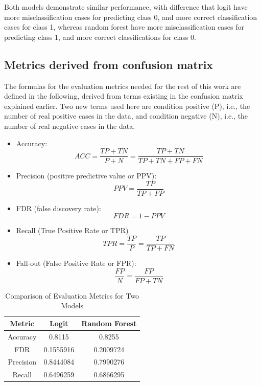 \documentclass{article}
\providecommand{\tightlist}{%
  \setlength{\itemsep}{0pt}\setlength{\parskip}{0pt}}
\begin{document}
Both models demonstrate similar performance, with difference that logit
have more misclassification cases for predicting class 0, and more
correct classification cases for class 1, whereas random forest have
more misclassification cases for predicting class 1, and more correct
classifications for class 0.

\hypertarget{metrics-derived-from-confusion-matrix}{%
\subsection{Metrics derived from confusion
matrix}\label{metrics-derived-from-confusion-matrix}}

The formulas for the evaluation metrics needed for the rest of this work
are defined in the following, derived from terms existing in the
confusion matrix explained earlier. Two new terms used here are
condition positive (P), i.e., the number of real positive cases in the
data, and condition negative (N), i.e., the number of real negative
cases in the data.

\begin{itemize}
\tightlist
\item
  Accuracy:
  \[ACC = \frac{TP + TN}{P + N} = \frac{TP + TN}{TP + TN + FP + FN}\]
\item
  Precision (positive predictive value or PPV):
  \[PPV = \frac{TP}{TP + FP}\]
\item
  FDR (false discovery rate): \[FDR = 1 - PPV\]
\item
  Recall (True Positive Rate or TPR)
  \[TPR = \frac{TP}{P} = \frac{TP}{TP + FN}\]
\item
  Fall-out (False Positive Rate or FPR):
  \[\frac{FP}{N} = \frac{FP}{FP + TN}\]
\end{itemize}

\begin{table}[h]
\centering
\begin{tabular}{|c|c|c|}
\hline
\textbf{Metric} & \textbf{Logit} & \textbf{Random Forest} \\
\hline
Accuracy & 0.8115 & 0.8255 \\
FDR & 0.1555916 & 0.2009724 \\
Precision & 0.8444084 & 0.7990276 \\
Recall & 0.6496259 & 0.6866295 \\
\hline
\end{tabular}
\caption{Comparison of Evaluation Metrics for Two Models}
\label{tab:comparison}
\end{table}
\end{document}
